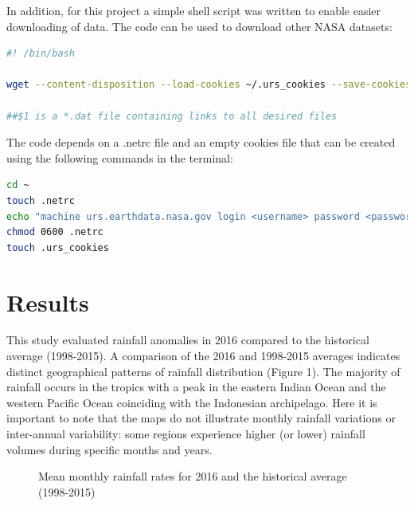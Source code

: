 \documentclass[12pt]{article}
\begin{document}
In addition, for this project a simple shell script was written to enable easier downloading of data. The code can be used to download other NASA datasets:\\
\begin{lstlisting}[language=bash]
#! /bin/bash

wget --content-disposition --load-cookies ~/.urs_cookies --save-cookies ~/.urs_cookies --auth-no-challenge=on --keep-session-cookies -i $1

##$1 is a *.dat file containing links to all desired files
\end{lstlisting}

The code depends on a .netrc file and an empty cookies file that can be created using the following commands in the terminal:
\begin{lstlisting}[language=bash]
cd ~
touch .netrc
echo "machine urs.earthdata.nasa.gov login <username> password <password>" >> .netrc
chmod 0600 .netrc
touch .urs_cookies
\end{lstlisting}


\section{Results}
This study evaluated rainfall anomalies in 2016 compared to the historical average (1998-2015). A comparison of the 2016 and 1998-2015 averages indicates distinct geographical patterns of rainfall distribution (Figure 1). The majority of rainfall occurs in the tropics with a peak in the eastern Indian Ocean and the western Pacific Ocean coinciding with the Indonesian archipelago. Here it is important to note that the maps do not illustrate monthly rainfall variations or inter-annual variability: some regions experience higher (or lower) rainfall volumes during specific months and years.

\begin{figure}[htb]
    \label{fig:averages}
\centering
  \hfill
  \hfill
\caption{Mean monthly rainfall rates for 2016 and the historical average (1998-2015)}
\end{figure}
\end{document}
